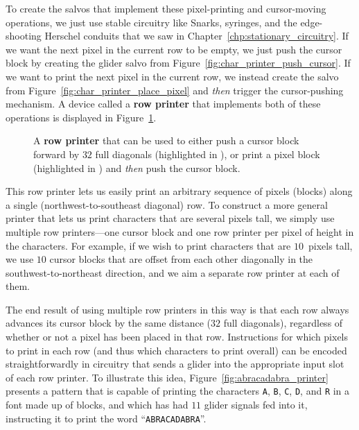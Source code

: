 To create the salvos that implement these pixel-printing and cursor-moving operations, we just use stable circuitry like Snarks, syringes, and the edge-shooting Herschel conduits that we saw in Chapter~\ref{chp:stationary_circuitry}. If we want the next pixel in the current row to be empty, we just push the cursor block by creating the glider salvo from Figure~\ref{fig:char_printer_push_cursor}. If we want to print the next pixel in the current row, we instead create the salvo from Figure~\ref{fig:char_printer_place_pixel} and \emph{then} trigger the cursor-pushing mechanism. A device called a \textbf{row printer} that implements both of these operations is displayed in Figure~\ref{fig:row_printer}.

\begin{figure}[!htb]
	\centering
	\caption{A \textbf{row printer} that can be used to either push a cursor block forward by $32$ full diagonals (highlighted in ), or print a pixel block (highlighted in ) and \emph{then} push the cursor block.}\label{fig:row_printer}
\end{figure}

This row printer lets us easily print an arbitrary sequence of pixels (blocks) along a single (northwest-to-southeast diagonal) row. To construct a more general printer that lets us print characters that are several pixels tall, we simply use multiple row printers---one cursor block and one row printer per pixel of height in the characters. For example, if we wish to print characters that are $10$~pixels tall, we use $10$ cursor blocks that are offset from each other diagonally in the southwest-to-northeast direction, and we aim a separate row printer at each of them.

The end result of using multiple row printers in this way is that each row always advances its cursor block by the same distance ($32$ full diagonals), regardless of whether or not a pixel has been placed in that row. Instructions for which pixels to print in each row (and thus which characters to print overall) can be encoded straightforwardly in circuitry that sends a glider into the appropriate input slot of each row printer. To illustrate this idea, Figure~\ref{fig:abracadabra_printer} presents a pattern that is capable of printing the characters \texttt{A}, \texttt{B}, \texttt{C}, \texttt{D}, and \texttt{R} in a font made up of blocks, and which has had $11$ glider signals fed into it, instructing it to print the word ``\texttt{ABRACADABRA}''.

